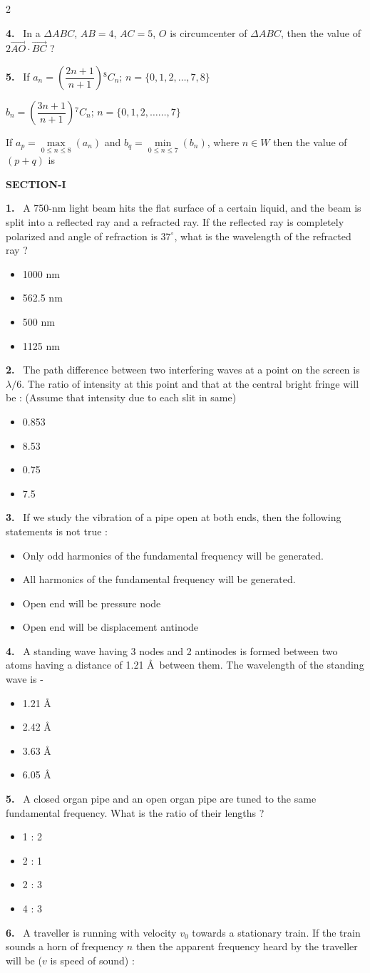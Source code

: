 \documentclass[10pt]{extarticle}
\newcommand{\papersec}[1]{\par\bigskip{\centering\Large\bfseries PAPER-#1\par}\medskip}
\newcommand{\partsec}[2]{\par\medskip\noindent{\large\bfseries PART-#1: #2}\par\smallskip}
\newcommand{\sect}[1]{\par\smallskip\noindent\textbf{#1}\par}
\newcommand{\qn}[1]{\par\smallskip\noindent\textbf{#1.}~}
\newenvironment{qoptions}{\begin{itemize}[leftmargin=1.8em,itemsep=1pt,topsep=2pt,label={}]}{\end{itemize}}
\newcommand{\opt}[2]{\item[(#1)] #2}
\begin{document}
\begin{multicols}{2}
\qn{4} In a $\Delta ABC$, $AB=4$, $AC=5$, $O$ is circumcenter of $\Delta ABC$, then the value of $2\overrightarrow{AO}\cdot\overrightarrow{BC}$ ?
\qn{5} If $a_n=\left(\dfrac{2n+1}{n+1}\right){}^8C_n$; $n=\{0,1,2,\dots,7,8\}$\par
$b_n=\left(\dfrac{3n+1}{n+1}\right){}^7C_n$; $n=\{0,1,2,\dots\dots,7\}$\par
If $a_p=\max\limits_{0\le n\le8}(a_n)$ and $b_q=\min\limits_{0\le n\le7}(b_n)$, where $n\in W$ then the value of $(p+q)$ is
\raggedcolumns
\papersec{2}
\partsec{1}{PHYSICS}
\sect{SECTION-I}
\qn{1} A 750-nm light beam hits the flat surface of a certain liquid, and the beam is split into a reflected ray and a refracted ray. If the reflected ray is completely polarized and angle of refraction is $37^\circ$, what is the wavelength of the refracted ray ?
\begin{qoptions}
\opt{A}{1000 nm}
\opt{B}{562.5 nm}
\opt{C}{500 nm}
\opt{D}{1125 nm}
\end{qoptions}
\qn{2} The path difference between two interfering waves at a point on the screen is $\lambda/6$. The ratio of intensity at this point and that at the central bright fringe will be : (Assume that intensity due to each slit in same)
\begin{qoptions}
\opt{A}{0.853}
\opt{B}{8.53}
\opt{C}{0.75}
\opt{D}{7.5}
\end{qoptions}
\qn{3} If we study the vibration of a pipe open at both ends, then the following statements is not true :
\begin{qoptions}
\opt{A}{Only odd harmonics of the fundamental frequency will be generated.}
\opt{B}{All harmonics of the fundamental frequency will be generated.}
\opt{C}{Open end will be pressure node}
\opt{D}{Open end will be displacement antinode}
\end{qoptions}
\qn{4} A standing wave having 3 nodes and 2 antinodes is formed between two atoms having a distance of 1.21 \AA\ between them. The wavelength of the standing wave is -
\begin{qoptions}
\opt{A}{1.21 \AA}
\opt{B}{2.42 \AA}
\opt{C}{3.63 \AA}
\opt{D}{6.05 \AA}
\end{qoptions}
\qn{5} A closed organ pipe and an open organ pipe are tuned to the same fundamental frequency. What is the ratio of their lengths ?
\begin{qoptions}
\opt{A}{1 : 2}
\opt{B}{2 : 1}
\opt{C}{2 : 3}
\opt{D}{4 : 3}
\end{qoptions}
\qn{6} A traveller is running with velocity $v_0$ towards a stationary train. If the train sounds a horn of frequency $n$ then the apparent frequency heard by the traveller will be ($v$ is speed of sound) :

\end{multicols}
\end{document}
